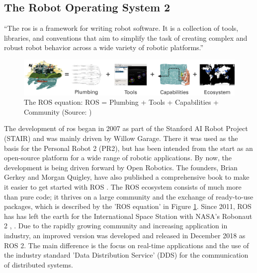\subsection{The Robot Operating System 2}
\begin{displayquote}
    \enquote{The \acrfull{ros} is a framework for writing robot software. It is a collection of tools, libraries, and conventions that aim to simplify the task of creating
    complex and robust robot behavior across a wide variety of robotic platforms.} \cite{Quigley.2015}
\end{displayquote}
    
\begin{figure}[h]
    \centering
    \includegraphics[width=1\textwidth]{figures/02_state_of_the_art/ros_equation.png}
    \caption[The ROS equation]{The ROS equation: ROS = Plumbing + Tools + Capabilities + Community (Source: \cite{OpenRobotics_About.2020})}
    \label{fig:ros_equation}
\end{figure}

The development of \gls{ros} began in 2007 as part of the Stanford AI Robot Project (STAIR) and was mainly driven by Willow Garage. There it was used as the basis for the Personal Robot 2 (PR2), but has been intended from the start as an open-source platform for a wide range of robotic applications. By now, the development is being driven forward by Open Robotics. The founders, Brian Gerkey and Morgan Quigley, have also published a comprehensive book to make it easier to get started with ROS \cite{Quigleyetal}. The ROS ecosystem consists of much more than pure code; it thrives on a large community and the exchange of ready-to-use packages, which is described by the 'ROS equation' in Figure \ref{fig:ros_equation}. Since 2011, ROS has has left the earth for the International Space Station with NASA's Robonaut 2 \cite{Diftleretal.2011}, \cite{Badgeretal.2016}. Due to the rapidly growing community and increasing application in industry, an improved version was developed and released in December 2018 as ROS 2. The main difference is the focus on real-time applications and the use of the industry standard 'Data Distribution Service' (DDS) for the communication of distributed systems.

